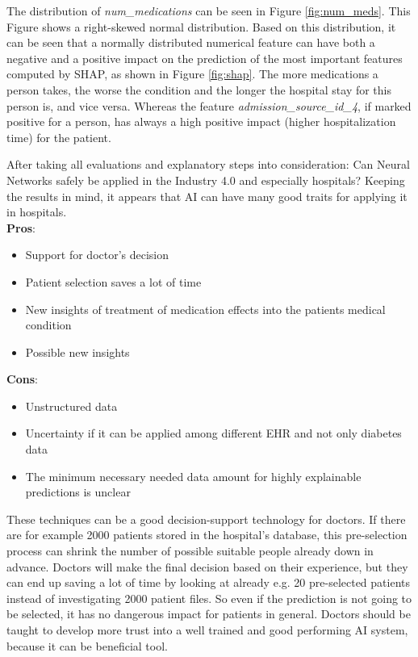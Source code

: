 \documentclass[journal]{IEEEtran}
\begin{document}
The distribution of \textit{num\_medications} can be seen in Figure \ref{fig:num_meds}. This Figure shows a right-skewed normal distribution. Based on this distribution, it can be seen that a normally distributed numerical feature can have both a negative and a positive impact on the prediction of the most important features computed by SHAP, as shown in Figure \ref{fig:shap}. The more medications a person takes, the worse the condition and the longer the hospital stay for this person is, and vice versa. Whereas the feature \textit{admission\_source\_id\_4}, if marked positive for a person, has always a high positive impact (higher hospitalization time) for the patient.  

After taking all evaluations and explanatory steps into consideration: Can Neural Networks safely be applied in the Industry 4.0 and especially hospitals? Keeping the results in mind, it appears that AI can have many good traits for applying it in hospitals.  \\ 

\textbf{Pros}: 

\begin{itemize}
	\item Support for doctor's decision
	\item Patient selection saves a lot of time
	\item New insights of treatment of medication effects into the patients medical condition
	\item Possible new insights \\
\end{itemize}

\textbf{Cons}: 

\begin{itemize}
	\item Unstructured data
	\item Uncertainty if it can be applied among different EHR and not only diabetes data
	\item The minimum necessary needed data amount for highly explainable predictions is unclear \\
\end{itemize}

These techniques can be a good decision-support technology for doctors. If there are for example 2000 patients stored in the hospital's database, this pre-selection process can shrink the number of possible suitable people already down in advance. Doctors will make the final decision based on their experience, but they can end up saving a lot of time by looking at already e.g. 20 pre-selected patients instead of investigating 2000 patient files. So even if the prediction is not going to be selected, it has no dangerous impact for patients in general. Doctors should be taught to develop more trust into a well trained and good performing AI system, because it can be beneficial tool.
\end{document}
